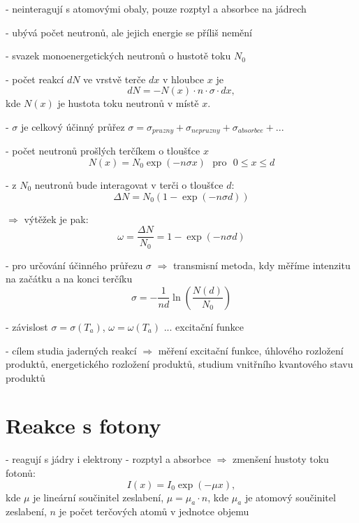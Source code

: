\documentclass[../../main.tex]{subfiles}
\begin{document}
- neinteragují s atomovými obaly, pouze rozptyl a absorbce na jádrech

- ubývá počet neutronů, ale jejich energie se příliš nemění

- svazek monoenergetických neutronů o hustotě toku $N_0$

- počet reakcí $dN$ ve vrstvě terče $dx$ v hloubce $x$ je 
\begin{equation}
dN = - N(x) \cdotp n \cdotp \sigma \cdotp dx,
\end{equation}
kde $N(x)$ je hustota toku neutronů v místě $x$.

- $\sigma$ je celkový účinný průřez $\sigma = \sigma _{pruzny} + \sigma _{nepruzny} + \sigma _{absorbce} + ... $

- počet neutronů prošlých terčíkem o tloušťce $x$
\begin{equation}
N(x) = N_0 \exp (- n \sigma x) ~~~ \textrm{pro} ~~~ 0 \leq x \leq d
\end{equation} 

- z $N_0$ neutronů bude interagovat v terči o tloušťce $d$:
\begin{equation}
\Delta N = N_0 (1 - \exp(- n \sigma d))
\end{equation}

$\Rightarrow$ výtěžek je pak:
\begin{equation}
\omega = \dfrac{\Delta N}{N_0} = 1 - \exp(- n \sigma d)
\end{equation}

- pro určování účinného průřezu $\sigma$ $\Rightarrow$ transmisní metoda, kdy měříme intenzitu na začátku a na konci terčíku
\begin{equation}
\sigma = - \dfrac{1}{nd} \ln \left(  \dfrac{N(d)}{N_0} \right)
\end{equation}

- závislost $\sigma = \sigma (T_a) $, $\omega = \omega (T_a) $ ... excitační funkce

- cílem studia jaderných reakcí $\Rightarrow$ měření excitační funkce, úhlového rozložení produktů, energetického rozložení produktů, studium vnitřního kvantového stavu produktů 

\section{Reakce s fotony}

- reagují s jádry i elektrony - rozptyl a absorbce $\Rightarrow$ zmenšení hustoty toku fotonů:
\begin{equation}
I(x) = I_0 \exp (- \mu x),
\end{equation}
kde $\mu$ je lineární součinitel zeslabení, $\mu = \mu _a \cdotp n$, kde $\mu_a$ je atomový součinitel zeslabení, $n$ je počet terčových atomů v jednotce objemu
\end{document}

